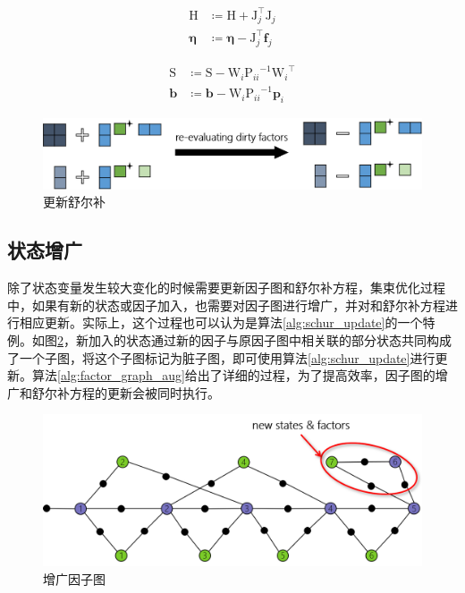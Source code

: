 \begin{algorithm}
\begin{algorithmic}
        \[\begin{aligned}
                \mathrm{H} &\coloneqq \mathrm{H} + \mathrm{J}_j^\top\mathrm{J}_j \\
                \bm{\eta}  &\coloneqq \bm{\eta}  - \mathrm{J}_j^\top\bm{f}_j
        \end{aligned}\]
    \EndFor

        \[\begin{aligned}
                \mathrm{S} &\coloneqq \mathrm{S} - \mathrm{W}_i{\mathrm{P}_{ii}}^{-1}{\mathrm{W}_i}^\top \\
                \bm{b}     &\coloneqq \bm{b}     - \mathrm{W}_i{\mathrm{P}_{ii}}^{-1}\bm{p}_i
        \end{aligned}\]
    \EndFor

\end{algorithmic}
\label{alg:schur_update}
\end{algorithm}

\begin{figure}[htb!]
    \centering
    \includegraphics[width=\textwidth]{figs/schur_update.png}
    \caption{更新舒尔补}
    \label{fig:schur_update}
\end{figure}

\subsection{状态增广}

除了状态变量发生较大变化的时候需要更新因子图和舒尔补方程，集束优化过程中，如果有新的状态或因子加入，也需要对因子图进行增广，并对和舒尔补方程进行相应更新。实际上，这个过程也可以认为是算法\ref{alg:schur_update}的一个特例。如图\ref{fig:factor_graph_aug}，新加入的状态通过新的因子与原因子图中相关联的部分状态共同构成了一个子图，将这个子图标记为脏子图，即可使用算法\ref{alg:schur_update}进行更新。算法\ref{alg:factor_graph_aug}给出了详细的过程，为了提高效率，因子图的增广和舒尔补方程的更新会被同时执行。

\begin{figure}[htb!]
    \centering
    \includegraphics[width=.8\textwidth]{figs/factor_graph_aug.png}
    \caption{增广因子图}
    \label{fig:factor_graph_aug}
\end{figure}

